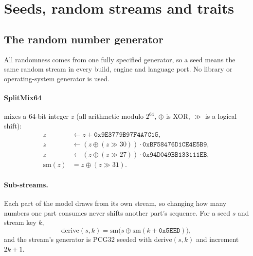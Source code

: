 \section{Seeds, random streams and traits}\label{sec:seeds}

\subsection{The random number generator}
All randomness comes from one fully specified generator, so a seed means the
same random stream in every build, engine and language port. No library or
operating-system generator is used.

\paragraph{SplitMix64} mixes a 64-bit integer $z$ (all arithmetic modulo $2^{64}$,
$\oplus$ is XOR, $\gg$ is a logical shift):
\begin{align*}
z &\leftarrow z + \texttt{0x9E3779B97F4A7C15},\\
z &\leftarrow (z \oplus (z \gg 30)) \cdot \texttt{0xBF58476D1CE4E5B9},\\
z &\leftarrow (z \oplus (z \gg 27)) \cdot \texttt{0x94D049BB133111EB},\\
\mathrm{sm}(z) &= z \oplus (z \gg 31).
\end{align*}

\paragraph{Sub-streams.} Each part of the model draws from its own stream, so
changing how many numbers one part consumes never shifts another part's
sequence. For a seed $s$ and stream key $k$,
\[
  \mathrm{derive}(s,k) = \mathrm{sm}\bigl(s \oplus \mathrm{sm}(k + \texttt{0x5EED})\bigr),
\]
and the stream's generator is PCG32 seeded with $\mathrm{derive}(s,k)$ and
increment $2k+1$.


